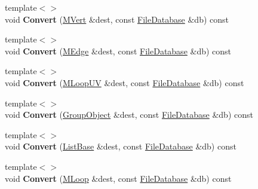 \begin{DoxyCompactItemize}
\item 
\hypertarget{class_assimp_1_1_blender_1_1_structure_a4395bdf3148f9f3e85a57f0cffd06295}{{\footnotesize template$<$$>$ }\\void {\bfseries Convert} (\hyperlink{struct_assimp_1_1_blender_1_1_m_vert}{M\+Vert} \&dest, const \hyperlink{class_assimp_1_1_blender_1_1_file_database}{File\+Database} \&db) const }\label{class_assimp_1_1_blender_1_1_structure_a4395bdf3148f9f3e85a57f0cffd06295}

\item 
\hypertarget{class_assimp_1_1_blender_1_1_structure_aed54929a37a747d9eaf0d5031e1856f1}{{\footnotesize template$<$$>$ }\\void {\bfseries Convert} (\hyperlink{struct_assimp_1_1_blender_1_1_m_edge}{M\+Edge} \&dest, const \hyperlink{class_assimp_1_1_blender_1_1_file_database}{File\+Database} \&db) const }\label{class_assimp_1_1_blender_1_1_structure_aed54929a37a747d9eaf0d5031e1856f1}

\item 
\hypertarget{class_assimp_1_1_blender_1_1_structure_a07a103488b5b73cdbe60b9758aa917a2}{{\footnotesize template$<$$>$ }\\void {\bfseries Convert} (\hyperlink{struct_assimp_1_1_blender_1_1_m_loop_u_v}{M\+Loop\+U\+V} \&dest, const \hyperlink{class_assimp_1_1_blender_1_1_file_database}{File\+Database} \&db) const }\label{class_assimp_1_1_blender_1_1_structure_a07a103488b5b73cdbe60b9758aa917a2}

\item 
\hypertarget{class_assimp_1_1_blender_1_1_structure_a143552873776d4fc9a49eed6aa1f25c6}{{\footnotesize template$<$$>$ }\\void {\bfseries Convert} (\hyperlink{struct_assimp_1_1_blender_1_1_group_object}{Group\+Object} \&dest, const \hyperlink{class_assimp_1_1_blender_1_1_file_database}{File\+Database} \&db) const }\label{class_assimp_1_1_blender_1_1_structure_a143552873776d4fc9a49eed6aa1f25c6}

\item 
\hypertarget{class_assimp_1_1_blender_1_1_structure_a64aa35a760b020f580431bea70edb246}{{\footnotesize template$<$$>$ }\\void {\bfseries Convert} (\hyperlink{struct_assimp_1_1_blender_1_1_list_base}{List\+Base} \&dest, const \hyperlink{class_assimp_1_1_blender_1_1_file_database}{File\+Database} \&db) const }\label{class_assimp_1_1_blender_1_1_structure_a64aa35a760b020f580431bea70edb246}

\item 
\hypertarget{class_assimp_1_1_blender_1_1_structure_a7769d18f58a6e79e66e09c73e8fac655}{{\footnotesize template$<$$>$ }\\void {\bfseries Convert} (\hyperlink{struct_assimp_1_1_blender_1_1_m_loop}{M\+Loop} \&dest, const \hyperlink{class_assimp_1_1_blender_1_1_file_database}{File\+Database} \&db) const }\label{class_assimp_1_1_blender_1_1_structure_a7769d18f58a6e79e66e09c73e8fac655}


\end{DoxyCompactItemize}
